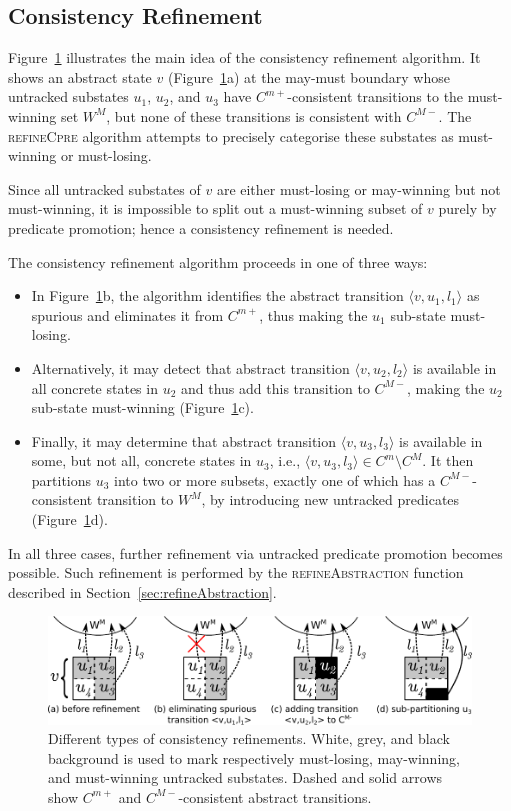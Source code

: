 \subsection{Consistency Refinement}
\label{sec:cons_refinement}

Figure~\ref{f:crefinement} illustrates the main idea of the consistency refinement algorithm.  It shows an abstract state $v$ (Figure~\ref{f:crefinement}a) at the may-must boundary whose untracked substates $u_1$, $u_2$, and $u_3$ have $C^{m+}$-consistent transitions to the must-winning set $W^M$, but none of these transitions is consistent with $C^{M-}$.  The \textsc{refineCpre} algorithm attempts to precisely categorise these substates as must-winning or must-losing.

Since all untracked substates of $v$ are either must-losing or may-winning but not must-winning, it is impossible to split out a must-winning subset of $v$ purely by predicate promotion; hence a consistency refinement is needed.

The consistency refinement algorithm proceeds in one of three ways:
\begin{itemize}
    \item In Figure~\ref{f:crefinement}b, the algorithm identifies the abstract transition $\langle v,u_1, l_1\rangle$ as spurious and eliminates it from $C^{m+}$, thus making the $u_1$ sub-state must-losing.  
    \item Alternatively, it may detect that abstract transition $\langle v, u_2, l_2\rangle$ is available in all concrete states in $u_2$ and thus add this transition to $C^{M-}$, making the $u_2$ sub-state must-winning (Figure~\ref{f:crefinement}c).  
    \item Finally, it may determine that abstract transition $\langle v, u_3, l_3\rangle$ is available in some, but not all, concrete states in $u_3$, i.e., $\langle v, u_3, l_3\rangle\in C^m\setminus C^M$.  It then partitions $u_3$ into two or more subsets, exactly one of which has a $C^{M-}$-consistent transition to $W^M$, by introducing new untracked predicates (Figure~\ref{f:crefinement}d).  
\end{itemize}

In all three cases, further refinement via untracked predicate promotion becomes possible.  Such refinement is performed by the \textsc{refineAbstraction} function described in Section~\ref{sec:refineAbstraction}.

\begin{figure}[t]
    \label{f:crefinement}
    \center
    \includegraphics[width=\linewidth]{imgs/crefinement}
    \caption{Different types of consistency refinements.  White, grey, and black background is used to mark respectively must-losing, may-winning, and must-winning untracked substates.  Dashed and solid arrows show $C^{m+}$ and $C^{M-}$-consistent abstract transitions.}
\end{figure}

